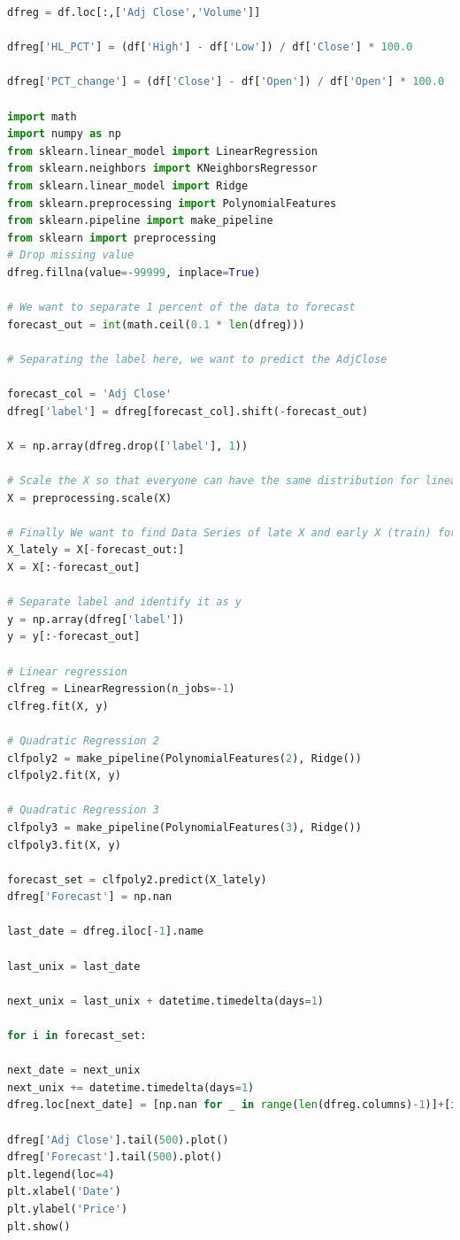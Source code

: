 \documentclass{whutmod}
\begin{document}
\begin{lstlisting}[language=python]
dfreg = df.loc[:,['Adj Close','Volume']]

dfreg['HL_PCT'] = (df['High'] - df['Low']) / df['Close'] * 100.0

dfreg['PCT_change'] = (df['Close'] - df['Open']) / df['Open'] * 100.0

import math
import numpy as np
from sklearn.linear_model import LinearRegression
from sklearn.neighbors import KNeighborsRegressor
from sklearn.linear_model import Ridge
from sklearn.preprocessing import PolynomialFeatures
from sklearn.pipeline import make_pipeline
from sklearn import preprocessing
# Drop missing value
dfreg.fillna(value=-99999, inplace=True)

# We want to separate 1 percent of the data to forecast
forecast_out = int(math.ceil(0.1 * len(dfreg)))

# Separating the label here, we want to predict the AdjClose

forecast_col = 'Adj Close'
dfreg['label'] = dfreg[forecast_col].shift(-forecast_out)

X = np.array(dfreg.drop(['label'], 1))

# Scale the X so that everyone can have the same distribution for linear regression
X = preprocessing.scale(X)

# Finally We want to find Data Series of late X and early X (train) for model generation and evaluation
X_lately = X[-forecast_out:]
X = X[:-forecast_out]

# Separate label and identify it as y
y = np.array(dfreg['label'])
y = y[:-forecast_out]

# Linear regression
clfreg = LinearRegression(n_jobs=-1)
clfreg.fit(X, y)

# Quadratic Regression 2
clfpoly2 = make_pipeline(PolynomialFeatures(2), Ridge())
clfpoly2.fit(X, y)

# Quadratic Regression 3
clfpoly3 = make_pipeline(PolynomialFeatures(3), Ridge())
clfpoly3.fit(X, y)

forecast_set = clfpoly2.predict(X_lately)
dfreg['Forecast'] = np.nan

last_date = dfreg.iloc[-1].name

last_unix = last_date

next_unix = last_unix + datetime.timedelta(days=1)

for i in forecast_set:

next_date = next_unix
next_unix += datetime.timedelta(days=1)
dfreg.loc[next_date] = [np.nan for _ in range(len(dfreg.columns)-1)]+[i]

dfreg['Adj Close'].tail(500).plot()
dfreg['Forecast'].tail(500).plot()
plt.legend(loc=4)
plt.xlabel('Date')
plt.ylabel('Price')
plt.show()
\end{lstlisting}
\end{document}
